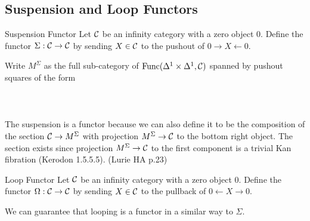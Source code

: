 \documentclass[a4paper]{article}
\begin{document}
\subsection{Suspension and Loop Functors}
\begin{defn}{Suspension Functor}{} Let $\mathcal{C}$ be an infinity category with a zero object $0$. Define the functor $\Sigma:\mathcal{C}\to\mathcal{C}$ by sending $X\in\mathcal{C}$ to the pushout of $0\rightarrow X\leftarrow 0$. 
\end{defn}

Write $M^\Sigma$ as the full sub-category of $\text{Func}(\Delta^1\times\Delta^1,\mathcal{C})$ spanned by pushout squares of the form \\~\\
\\~\\
The suspension is a functor because we can also define it to be the composition of the section $\mathcal{C}\to M^\Sigma$ with projection $M^\Sigma\to\mathcal{C}$ to the bottom right object. The section exists since projection $M^\Sigma\to\mathcal{C}$ to the first component is a trivial Kan fibration (Kerodon 1.5.5.5). (Lurie HA p.23)

\begin{defn}{Loop Functor}{} Let $\mathcal{C}$ be an infinity category with a zero object $0$. Define the functor $\Omega:\mathcal{C}\to\mathcal{C}$ by sending $X\in\mathcal{C}$ to the pullback of $0\leftarrow X\rightarrow0$. 
\end{defn}

We can guarantee that looping is a functor in a similar way to $\Sigma$. 
\end{document}
